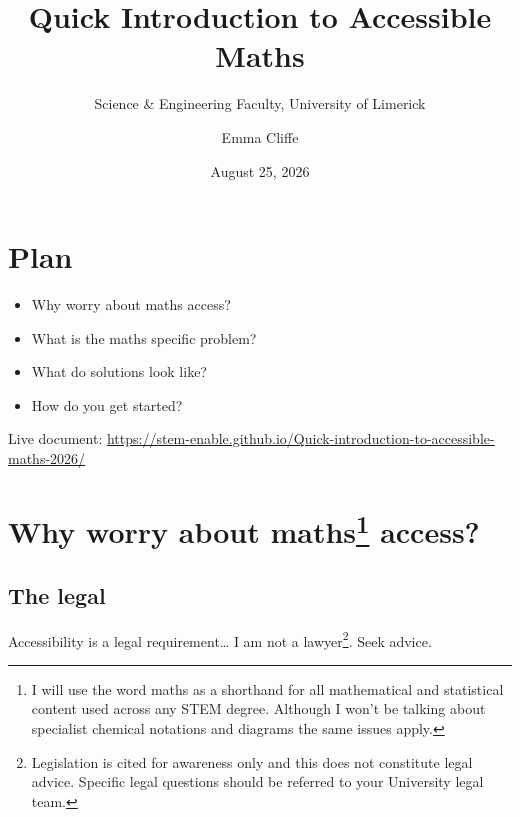 \documentclass[
  12pt,
  a4-paperpaper,
  DIV=11,
  numbers=noendperiod]{scrartcl}
\title{Quick Introduction to Accessible Maths}
\subtitle{Science \& Engineering Faculty, University of Limerick}
\author{Emma Cliffe}
\date{August 25, 2026}
\providecommand{\tightlist}{%
  \setlength{\itemsep}{0pt}\setlength{\parskip}{0pt}}
\renewcommand*\contentsname{Table of contents}
\newcommand\contentsname{Table of contents}
\begin{document}
\maketitle

\renewcommand*\contentsname{Table of contents}
{
\hypersetup{linkcolor=}
\setcounter{tocdepth}{3}
\tableofcontents
}

\section{Plan}\label{plan}

\begin{itemize}
\tightlist
\item
  Why worry about maths access?
\item
  What is the maths specific problem?
\item
  What do solutions look like?
\item
  How do you get started?
\end{itemize}

Live document:
\url{https://stem-enable.github.io/Quick-introduction-to-accessible-maths-2026/}

\section[Why worry about maths access?]{\texorpdfstring{Why worry about
maths\footnote{I will use the word maths as a shorthand for all
  mathematical and statistical content used across any STEM degree.
  Although I won't be talking about specialist chemical notations and
  diagrams the same issues apply.}
access?}{Why worry about maths access?}}\label{why-worry-about-maths1-access}

\subsection{The legal}\label{the-legal}

Accessibility is a legal requirement\ldots{} I am not a
lawyer\footnote{Legislation is cited for awareness only and this does
  not constitute legal advice. Specific legal questions should be
  referred to your University legal team.}. Seek advice.
\end{document}
